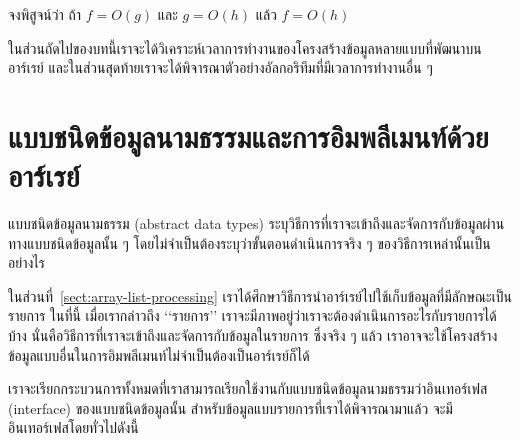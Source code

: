 \begin{quiz}{}
จง{\wbr}พิสูจน์{\wbr}ว่า ถ้า $f=O(g)$ และ $g=O(h)$ แล้ว $f=O(h)$
\end{quiz}

ใน{\wbr}ส่วน{\wbr}ถัด{\wbr}ไป{\wbr}ของ{\wbr}บท{\wbr}นี้{\wbr}เรา{\wbr}จะ{\wbr}ได้{\wbr}วิเคราะห์{\wbr}เวลา{\wbr}การ{\wbr}ทำงาน{\wbr}ของ{\wbr}โครงสร้าง{\wbr}ข้อมูล{\wbr}หลาย{\wbr}แบบ{\wbr}ที่{\wbr}พัฒนา{\wbr}บน{\wbr}อาร์เรย์
และ{\wbr}ใน{\wbr}ส่วน{\wbr}สุดท้าย{\wbr}เรา{\wbr}จะ{\wbr}ได้{\wbr}พิจารณา{\wbr}ตัวอย่าง{\wbr}อัล{\wbr}กอ{\wbr}ริ{\wbr}ทึม{\wbr}ที่{\wbr}มี{\wbr}เวลา{\wbr}การ{\wbr}ทำงาน{\wbr}อื่น ๆ

\section{แบบ{\wbr}ชนิด{\wbr}ข้อมูล{\wbr}นามธรรม{\wbr}และ{\wbr}การ{\wbr}อิม{\wbr}พลี{\wbr}เมนท์{\wbr}ด้วย{\wbr}อาร์เรย์}

แบบ{\wbr}ชนิด{\wbr}ข้อมูล{\wbr}นามธรรม (abstract data types)
ระบุ{\wbr}วิธีการ{\wbr}ที่{\wbr}เรา{\wbr}จะ{\wbr}เข้าถึง{\wbr}และ{\wbr}จัดการ{\wbr}กับ{\wbr}ข้อมูล{\wbr}ผ่าน{\wbr}ทาง{\wbr}แบบ{\wbr}ชนิด{\wbr}ข้อมูล{\wbr}นั้น ๆ
โดย{\wbr}ไม่{\wbr}จำเป็น{\wbr}ต้อง{\wbr}ระบุ{\wbr}ว่า{\wbr}ขั้นตอน{\wbr}ดำเนินการ{\wbr}จริง ๆ ของ{\wbr}วิธีการ{\wbr}เหล่านั้น{\wbr}เป็น{\wbr}อย่างไร{\wbr}

ใน{\wbr}ส่วน{\wbr}ที่~\ref{sect:array-list-processing}
เรา{\wbr}ได้{\wbr}ศึกษา{\wbr}วิธีการ{\wbr}นำ{\wbr}อาร์เรย์{\wbr}ไป{\wbr}ใช้{\wbr}เก็บ{\wbr}ข้อมูล{\wbr}ที่{\wbr}มี{\wbr}ลักษณะ{\wbr}เป็น{\wbr}รายการ ใน{\wbr}ที่นี้ เมื่อ{\wbr}เรา{\wbr}กล่าว{\wbr}ถึง{\wbr}
`{\wbr}`{\wbr}รายการ'' เรา{\wbr}จะ{\wbr}มี{\wbr}ภาพ{\wbr}อยู่{\wbr}ว่า{\wbr}เรา{\wbr}จะ{\wbr}ต้อง{\wbr}ดำเนินการ{\wbr}อะไร{\wbr}กับ{\wbr}รายการ{\wbr}ได้{\wbr}บ้าง{\wbr}
นั่น{\wbr}คือ{\wbr}วิธีการ{\wbr}ที่{\wbr}เรา{\wbr}จะ{\wbr}เข้าถึง{\wbr}และ{\wbr}จัดการ{\wbr}กับ{\wbr}ข้อมูล{\wbr}ใน{\wbr}รายการ ซึ่ง{\wbr}จริง ๆ แล้ว{\wbr}
เรา{\wbr}อาจ{\wbr}จะ{\wbr}ใช้{\wbr}โครงสร้าง{\wbr}ข้อมูล{\wbr}แบบ{\wbr}อื่น{\wbr}ใน{\wbr}การ{\wbr}อิม{\wbr}พลี{\wbr}เมนท์{\wbr}ไม่{\wbr}จำเป็น{\wbr}ต้อง{\wbr}เป็น{\wbr}อาร์เรย์{\wbr}ก็ได้{\wbr}

เรา{\wbr}จะ{\wbr}เรียก{\wbr}กระบวนการ{\wbr}ทั้งหมด{\wbr}ที่{\wbr}เรา{\wbr}สามารถ{\wbr}เรียก{\wbr}ใช้{\wbr}งาน{\wbr}กับ{\wbr}แบบ{\wbr}ชนิด{\wbr}ข้อมูล{\wbr}นามธรรม{\wbr}ว่า{\wbr}อิน{\wbr}เทอร์เฟส
(interface) ของ{\wbr}แบบ{\wbr}ชนิด{\wbr}ข้อมูล{\wbr}นั้น สำหรับ{\wbr}ข้อมูล{\wbr}แบบ{\wbr}รายการ{\wbr}ที่{\wbr}เรา{\wbr}ได้{\wbr}พิจารณา{\wbr}มา{\wbr}แล้ว{\wbr}
จะ{\wbr}มี{\wbr}อิน{\wbr}เทอร์เฟส{\wbr}โดย{\wbr}ทั่วไป{\wbr}ดังนี้{\wbr}

